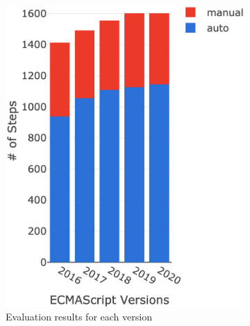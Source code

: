 \begin{figure}[t]
  \centering
  \begin{subfigure}{0.23\textwidth}
    \includegraphics[width=\textwidth]{img/all-version-sem.png}
    \caption{Evaluation results for each version}
    \label{fig:semantics-all-version}
  \end{subfigure}
  \hfill
  \begin{subfigure}{0.20\textwidth}

\end{subfigure}
\end{figure}
